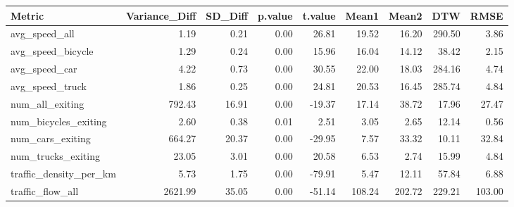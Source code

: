 \begin{table}[ht]
\centering
\begin{tabular}{lrrrrrrrr}
  \hline
Metric & Variance\_Diff & SD\_Diff & p.value & t.value & Mean1 & Mean2 & DTW & RMSE \\ 
  \hline
avg\_speed\_all & 1.19 & 0.21 & 0.00 & 26.81 & 19.52 & 16.20 & 290.50 & 3.86 \\ 
  avg\_speed\_bicycle & 1.29 & 0.24 & 0.00 & 15.96 & 16.04 & 14.12 & 38.42 & 2.15 \\ 
  avg\_speed\_car & 4.22 & 0.73 & 0.00 & 30.55 & 22.00 & 18.03 & 284.16 & 4.74 \\ 
  avg\_speed\_truck & 1.86 & 0.25 & 0.00 & 24.81 & 20.53 & 16.45 & 285.74 & 4.84 \\ 
  num\_all\_exiting & 792.43 & 16.91 & 0.00 & -19.37 & 17.14 & 38.72 & 17.96 & 27.47 \\ 
  num\_bicycles\_exiting & 2.60 & 0.38 & 0.01 & 2.51 & 3.05 & 2.65 & 12.14 & 0.56 \\ 
  num\_cars\_exiting & 664.27 & 20.37 & 0.00 & -29.95 & 7.57 & 33.32 & 10.11 & 32.84 \\ 
  num\_trucks\_exiting & 23.05 & 3.01 & 0.00 & 20.58 & 6.53 & 2.74 & 15.99 & 4.84 \\ 
  traffic\_density\_per\_km & 5.73 & 1.75 & 0.00 & -79.91 & 5.47 & 12.11 & 57.84 & 6.88 \\ 
  traffic\_flow\_all & 2621.99 & 35.05 & 0.00 & -51.14 & 108.24 & 202.72 & 229.21 & 103.00 \\ 
   \hline
\end{tabular}
\end{table}
